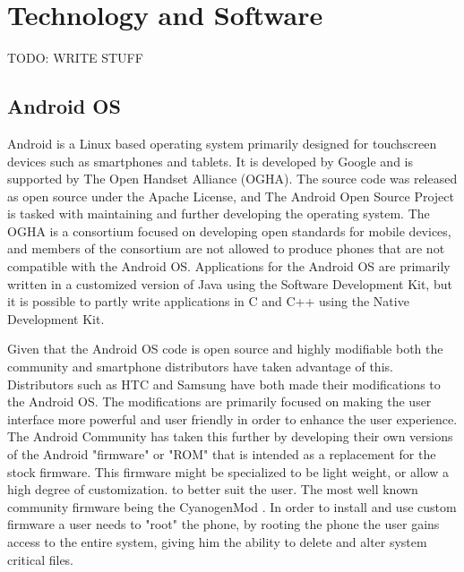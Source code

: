 \chapter{Technology and Software}
TODO: WRITE STUFF

\section{Android OS}
Android is a Linux based operating system primarily designed for touchscreen devices such as smartphones and tablets. It is developed by Google and is supported by The Open Handset Alliance (OGHA). The source code was released as open source under the Apache License, and The Android Open Source Project is tasked with maintaining and further developing the operating system. The OGHA is a consortium focused on developing open standards for mobile devices, and members of the consortium are not allowed to produce phones that are not compatible with the Android OS. Applications for the Android OS are primarily written in a customized version of Java using the Software Development Kit, but it is possible to partly write applications in C and C++ using the Native Development Kit. 

Given that the Android OS code is open source and highly modifiable both the community and smartphone distributors have taken advantage of this. Distributors such as HTC and Samsung have both made their modifications to the Android OS. The modifications are primarily focused on making the user interface more powerful and user friendly in order to enhance the user experience\cite{htcSense}. The Android Community has taken this further by developing their own versions of the Android "firmware" or "ROM" that is intended as a replacement for the stock firmware. This firmware might be specialized to be light weight, or allow a high degree of customization. to better suit the user. The most well known community firmware being the CyanogenMod \cite{cyanogenMod}. In order to install and use custom firmware a user needs to "root" the phone, by rooting the phone the user gains access to the entire system, giving him the ability to delete and alter system critical files.

